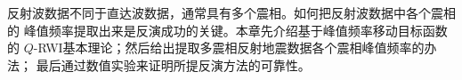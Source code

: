 反射波数据不同于直达波数据，通常具有多个震相。如何把反射波数据中各个震相的
峰值频率提取出来是反演成功的关键。本章先介绍基于峰值频率移动目标函数的
$Q$-RWI基本理论；然后给出提取多震相反射地震数据各个震相峰值频率的办法；
最后通过数值实验来证明所提反演方法的可靠性。

\begin{figure}[!htbp]
    \centering

\end{figure}
